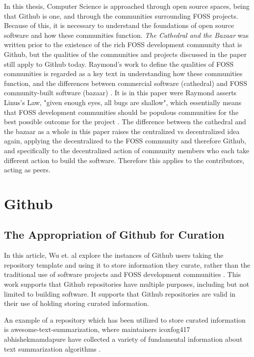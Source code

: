 In this thesis, Computer Science is approached through open source spaces, being that Github is one, and through the communities surrounding FOSS projects. Because of this, it is necessary to understand the foundations of open source software and how these communities function. \textit{The Cathedral and the Bazaar} was written prior to the existence of the rich FOSS development community that is Github, but the qualities of the communities and projects discussed in the paper still apply to Github today. Raymond's work to define the qualities of FOSS communities is regarded as a key text in understanding how these communities function, and the differences between commercial software (cathedral) and FOSS community-built software (bazaar) \cite{raymond2001cathedral}. It is in this paper were Raymond asserts Linus's Law, "given enough eyes, all bugs are shallow", which essentially means that FOSS development communities should be populous communities for the best possible outcome for the project \cite{raymond2001cathedral}. The difference between the cathedral and the bazaar as a whole in this paper raises the centralized vs decentralized idea again, applying the decentralized to the FOSS community and therefore Github, and specifically to the decentralized action of community members who each take different action to build the software. Therefore this applies to the contributors, acting as peers. 

\section{Github}

\subsection{The Appropriation of Github for Curation}

In this article, Wu et. al explore the instances of Github users taking the repository template and using it to store information they curate, rather than the traditional use of software projects and FOSS development communities \cite{wu2017github}. This work supports that Github repositories have multiple purposes, including but not limited to building software. It supports that Github repositories are valid in their use of holding storing curated information. 

An example of a repository which has been utilized to store curated information is awesome-text-summarization, where maintainers icoxfog417 abhishekmamdapure have collected a variety of fundamental information about text summarization algorithms \cite{awesomesum}.

